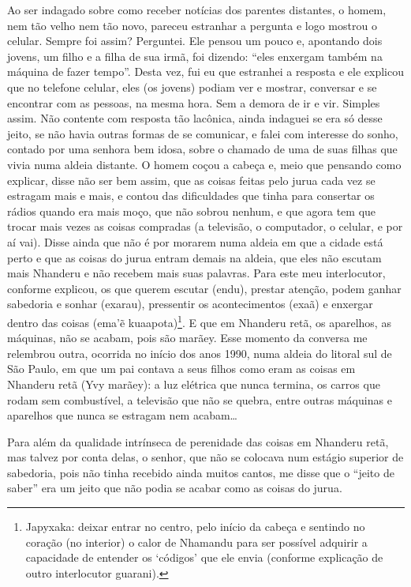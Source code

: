 Ao ser indagado sobre como receber notícias dos parentes distantes, o
homem, nem tão velho nem tão novo, pareceu estranhar a pergunta e logo
mostrou o celular. Sempre foi assim? Perguntei. Ele pensou um pouco e,
apontando dois jovens, um filho e a filha de sua irmã, foi dizendo:
``eles enxergam também na máquina de fazer tempo''. Desta vez, fui eu que
estranhei a resposta e ele explicou que no telefone celular, eles (os
jovens) podiam ver e mostrar, conversar e se encontrar com as pessoas,
na mesma hora. Sem a demora de ir e vir. Simples assim. Não contente
com resposta tão lacônica, ainda indaguei se era só desse jeito, se não
havia outras formas de se comunicar, e falei com interesse do sonho,
contado por uma senhora bem idosa, sobre o chamado de uma de suas
filhas que vivia numa aldeia distante. O homem coçou a cabeça e, meio
que pensando como explicar, disse não ser bem assim, que as coisas
feitas pelo jurua cada vez se estragam mais e mais, e contou das
dificuldades que tinha para consertar os rádios quando era mais moço,
que não sobrou nenhum, e que agora tem que trocar mais vezes as coisas
compradas (a televisão, o computador, o celular, e por aí vai). Disse
ainda que não é por morarem numa aldeia em que a cidade está perto e
que as coisas do jurua entram demais na aldeia, que eles não escutam
mais Nhanderu e não recebem mais suas palavras. Para este meu
interlocutor, conforme explicou, os que querem escutar (endu), prestar
atenção, podem ganhar sabedoria e sonhar (exarau), pressentir os
acontecimentos (exaã) e enxergar dentro das coisas (ema'ẽ
kuaapota)\footnote{Japyxaka: deixar entrar no centro, pelo início da
cabeça e sentindo no coração (no interior) o calor de Nhamandu para ser
possível adquirir a capacidade de entender os ‘códigos’ que ele envia
(conforme explicação de outro interlocutor guarani).}. E que em
Nhanderu retã, os aparelhos, as máquinas, não se acabam, pois são
marãey. Esse momento da conversa me relembrou outra, ocorrida no início
dos anos 1990, numa aldeia do litoral sul de São Paulo, em que um pai
contava a seus filhos como eram as coisas em Nhanderu retã (Yvy
marãey): a luz elétrica que nunca termina, os carros que rodam sem
combustível, a televisão que não se quebra, entre outras máquinas e
aparelhos que nunca se estragam nem acabam\ldots{} 

Para além da qualidade intrínseca de perenidade das coisas em Nhanderu
retã, mas talvez por conta delas, o senhor, que não se colocava num
estágio superior de sabedoria, pois não tinha recebido ainda muitos
cantos, me disse que o ``jeito de saber'' era um jeito que não podia se
acabar como as coisas do jurua.

